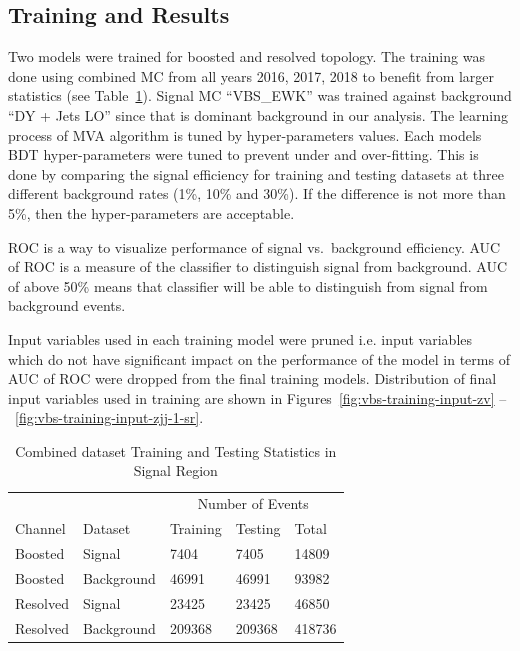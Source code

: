 \subsection{
  Training and Results
}

Two models were trained for boosted and resolved topology.
The training was done using combined MC from all years 2016, 2017, 2018
to benefit from larger statistics (see Table~\ref{tab:training-stats}).
Signal MC ``VBS\_EWK'' was trained against background ``DY + Jets LO'' since
that is dominant background in our analysis.
The learning process of \gls{MVA} algorithm is tuned by hyper-parameters values.
Each models \gls{BDT} hyper-parameters were tuned to prevent under and over-fitting.
This is done by comparing the signal efficiency for
training and testing datasets at three different background rates (1\%, 10\% and 30\%).
If the difference is not more than 5\%, then the hyper-parameters are
acceptable.

\gls{ROC} is a way to visualize performance of signal vs.\ background efficiency.
\gls{AUC} of \gls{ROC} is a measure of the classifier to distinguish signal from background.
\gls{AUC} of above 50\% means that classifier will be able to distinguish from signal
from background events.

Input variables used in each training model were pruned i.e.
input variables which do not have significant impact on the
performance of the model in terms of \gls{AUC} of \gls{ROC}
were dropped from the final training models.
Distribution of final input variables
used in training are shown in Figures~\ref{fig:vbs-training-input-zv} --~\ref{fig:vbs-training-input-zjj-1-sr}.

\begin{table}[!ht]
  \centering
  \caption{Combined dataset Training and Testing Statistics in Signal Region}
  \begin{tabular}{lllll}%
    \toprule
             &            & \multicolumn{3}{c}{Number of Events}                    \\
    \cmidrule(lr){3-5}
    Channel  & Dataset    & Training                             & Testing & Total  \\
    \midrule
    Boosted  & Signal     & 7404                                 & 7405    & 14809  \\
    Boosted  & Background & 46991                                & 46991   & 93982  \\
    \midrule
    Resolved & Signal     & 23425                                & 23425   & 46850  \\
    Resolved & Background & 209368                               & 209368  & 418736 \\
    \bottomrule
  \end{tabular}\label{tab:training-stats}
\end{table}


